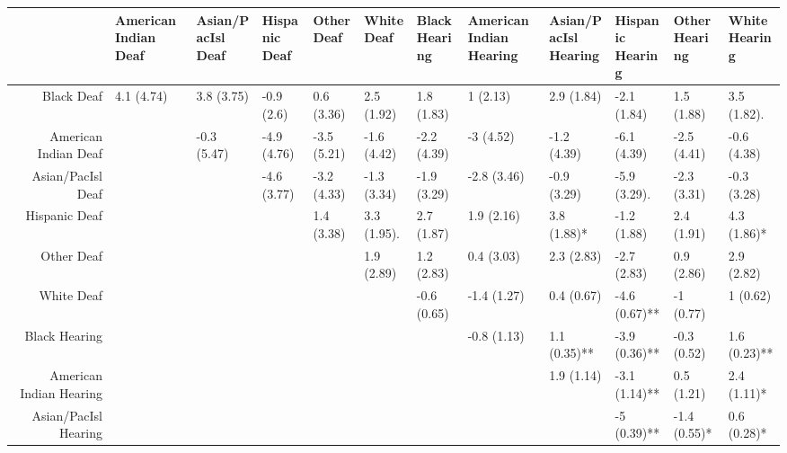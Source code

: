 \documentclass{article}\usepackage[]{graphicx}\usepackage[]{color}
\begin{document}
\begin{landscape}
\begin{table}[ht]
\centering
\begingroup\small
\begin{tabular}{rlllllllllll}
  \hline
 & \thead{American Indian\\Deaf} & \thead{Asian/PacIsl\\Deaf} & \thead{Hispanic\\Deaf} & \thead{Other\\Deaf} & \thead{White\\Deaf} & \thead{Black\\Hearing} & \thead{American Indian\\Hearing} & \thead{Asian/PacIsl\\Hearing} & \thead{Hispanic\\Hearing} & \thead{Other\\Hearing} & \thead{White\\Hearing} \\
  \hline
Black Deaf & 4.1 (4.74) & 3.8 (3.75) & -0.9 (2.6) & 0.6 (3.36) & 2.5 (1.92) & 1.8 (1.83) & 1 (2.13) & 2.9 (1.84) & -2.1 (1.84) & 1.5 (1.88) & 3.5 (1.82). \\
  American Indian Deaf &  & -0.3 (5.47) & -4.9 (4.76) & -3.5 (5.21) & -1.6 (4.42) & -2.2 (4.39) & -3 (4.52) & -1.2 (4.39) & -6.1 (4.39) & -2.5 (4.41) & -0.6 (4.38) \\
  Asian/PacIsl Deaf &  &  & -4.6 (3.77) & -3.2 (4.33) & -1.3 (3.34) & -1.9 (3.29) & -2.8 (3.46) & -0.9 (3.29) & -5.9 (3.29). & -2.3 (3.31) & -0.3 (3.28) \\
  Hispanic Deaf &  &  &  & 1.4 (3.38) & 3.3 (1.95). & 2.7 (1.87) & 1.9 (2.16) & 3.8 (1.88)* & -1.2 (1.88) & 2.4 (1.91) & 4.3 (1.86)* \\
  Other Deaf &  &  &  &  & 1.9 (2.89) & 1.2 (2.83) & 0.4 (3.03) & 2.3 (2.83) & -2.7 (2.83) & 0.9 (2.86) & 2.9 (2.82) \\
  White Deaf &  &  &  &  &  & -0.6 (0.65) & -1.4 (1.27) & 0.4 (0.67) & -4.6 (0.67)** & -1 (0.77) & 1 (0.62) \\
  Black Hearing &  &  &  &  &  &  & -0.8 (1.13) & 1.1 (0.35)** & -3.9 (0.36)** & -0.3 (0.52) & 1.6 (0.23)** \\
  American Indian Hearing &  &  &  &  &  &  &  & 1.9 (1.14) & -3.1 (1.14)** & 0.5 (1.21) & 2.4 (1.11)* \\
  Asian/PacIsl Hearing &  &  &  &  &  &  &  &  & -5 (0.39)** & -1.4 (0.55)* & 0.6 (0.28)* \\

\end{tabular}
\end{table}
\end{landscape}
\end{document}
